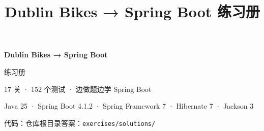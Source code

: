 \documentclass[11pt,a4paper,oneside,fontset=mac]{ctexbook}
\title{Dublin Bikes → Spring Boot 练习册}
\begin{document}
\begin{titlepage}
  \centering
  \vspace*{5cm}
  {\Huge\bfseries\sffamily\color{accent} Dublin Bikes → Spring Boot\par}
  \vspace{0.6cm}
  {\LARGE\sffamily 练习册\par}
  \vspace{1.2cm}
  {\large 17 关 · 152 个测试 · 边做题边学 Spring Boot\par}
  \vfill
  {\large Java 25 · Spring Boot 4.1.2 · Spring Framework 7 · Hibernate 7 · Jackson 3\par}
  \vspace{0.4cm}
  {\large 代码：仓库根目录\quad 答案：\texttt{exercises/solutions/}\par}
\end{titlepage}

\frontmatter
\tableofcontents

\mainmatter



















\appendix
{}

\end{document}

